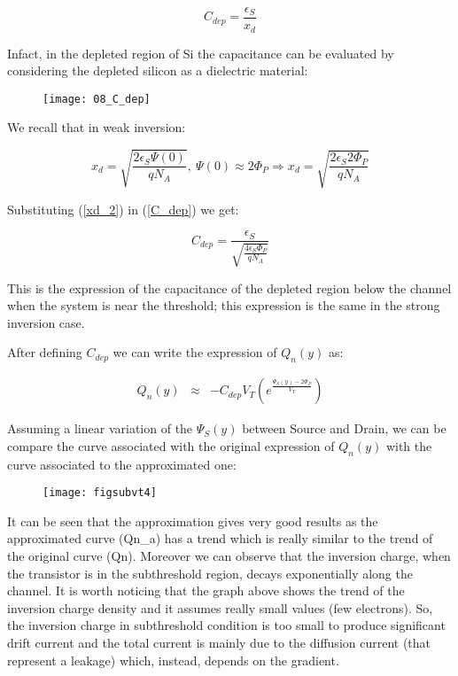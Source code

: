\documentclass[a4paper, 12pt, twoside, openright]{report}
\begin{document}
\begin{equation}
C_{dep} = \frac{\epsilon_S}{x_d}
\label{C_dep}
\end{equation}

Infact, in the depleted region of Si the capacitance can be evaluated by considering the depleted silicon as a dielectric material:

	\begin{figure}[H]
	\centering
	\texttt{[image: 08\_C\_dep]}
	\caption{}
	\label{}
	\end{figure}

We recall that in weak inversion:

\begin{equation}
x_d = \sqrt{\frac{2 \epsilon_S \Psi(0)}{qN_A}},\ \Psi(0) \approx 2\Phi_P \Rightarrow x_d = \sqrt{\frac{2 \epsilon_S 2\Phi_P}{qN_A}}
\label{xd_2}
\end{equation}

Substituting (\ref{xd_2}) in (\ref{C_dep}) we get:

\begin{equation}
C_{dep} = \frac{\epsilon_S}{\sqrt{\frac{4 \epsilon_S \Phi_P}{qN_A}}}
\label{}
\end{equation}

This is the expression of the capacitance of the depleted region below the channel when the system is near the threshold; this expression is the same in the strong inversion case.

After defining $C_{dep}$ we can write the expression of $Q_{n}(y)$ as:

	\begin{eqnarray*}
	Q_n(y)&\approx& -C_{dep} V_T \left(e^{\displaystyle \frac{\Psi_S(y)-2\Phi_P}{V_T}}\right)
	\end{eqnarray*}

Assuming a linear variation of the $\Psi_S(y)$ between Source and Drain, we can be compare the curve associated with the original expression of $Q_{n}(y)$ with the curve associated to the approximated one:

	\begin{figure}[H]
	\centering
	\texttt{[image: figsubvt4]}
	\caption{}
	\label{}
	\end{figure}

It can be seen that the approximation gives very good results as the approximated curve (Qn\_a) has a trend which is really similar to the trend of the original curve (Qn). Moreover we can observe that the inversion charge, when the transistor is in the subthreshold region, decays exponentially along the channel. It is worth noticing that the graph above shows the trend of the inversion charge density and it assumes really small values (few electrons). So, the inversion charge in subthreshold condition is too small to produce significant drift current and the total current is mainly due to the diffusion current (that represent a leakage) which, instead, depends on the gradient.
\end{document}
